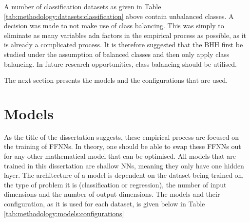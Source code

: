 A number of classification datasets as given in Table \ref{tab:methodology:datasets:classification} above contain unbalanced classes. A decision was made to not make use of class balancing. This was simply to eliminate as many variables adn factors in the empirical process as possible, as it is already a complicated process.  It is therefore suggested that the \ac{BHH} first be studied under the assumption of balanced classes and then only apply class balancing. In future research opportunities, class balancing should be utilised.

The next section presents the models and the configurations that are used.


\section{Models}
\label{sec:methodology:model}

As the title of the dissertation suggests, these empirical process are focused on the training of \acp{FFNN}. In theory, one should be able to swap these \acp{FFNN} out for any other mathematical model that can be optimised. All models that are trained in this dissertation are shallow \acp{NN}, meaning they only have one hidden layer. The architecture of a model is dependent on the dataset being trained on, the type of problem it is (classification or regression), the number of input dimensions and the number of output dimensions. The models and their configuration, as it is used for each dataset, is given below in Table \ref{tab:methodology:models:configurations}


